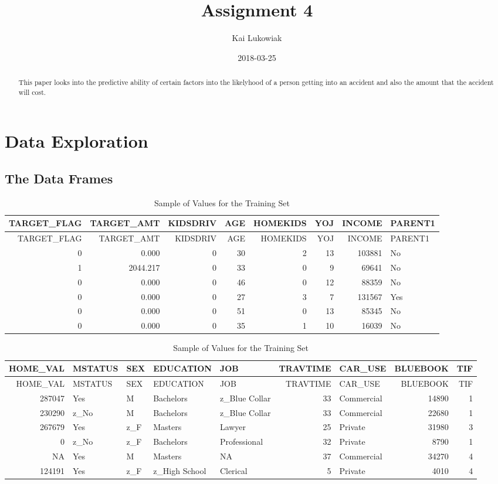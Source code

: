 \documentclass[]{article}
\title{Assignment 4}
\author{Kai Lukowiak}
\date{2018-03-25}
\begin{document}
\maketitle
\begin{abstract}
This paper looks into the predictive ability of certain factors into the
likelyhood of a person getting into an accident and also the amount that
the accident will cost.
\end{abstract}

{
\setcounter{tocdepth}{3}
\tableofcontents
}
\hypertarget{data-exploration}{%
\section{Data Exploration}\label{data-exploration}}

\hypertarget{the-data-frames}{%
\subsection{The Data Frames}\label{the-data-frames}}

\begin{longtable}[]{@{}rrrrrrrl@{}}
\caption{Sample of Values for the Training Set}\tabularnewline
\toprule
TARGET\_FLAG & TARGET\_AMT & KIDSDRIV & AGE & HOMEKIDS & YOJ & INCOME &
PARENT1\tabularnewline
\midrule
\endfirsthead
\toprule
TARGET\_FLAG & TARGET\_AMT & KIDSDRIV & AGE & HOMEKIDS & YOJ & INCOME &
PARENT1\tabularnewline
\midrule
\endhead
0 & 0.000 & 0 & 30 & 2 & 13 & 103881 & No\tabularnewline
1 & 2044.217 & 0 & 33 & 0 & 9 & 69641 & No\tabularnewline
0 & 0.000 & 0 & 46 & 0 & 12 & 88359 & No\tabularnewline
0 & 0.000 & 0 & 27 & 3 & 7 & 131567 & Yes\tabularnewline
0 & 0.000 & 0 & 51 & 0 & 13 & 85345 & No\tabularnewline
0 & 0.000 & 0 & 35 & 1 & 10 & 16039 & No\tabularnewline
\bottomrule
\end{longtable}

\begin{longtable}[]{@{}rllllrlrr@{}}
\caption{Sample of Values for the Training Set}\tabularnewline
\toprule
HOME\_VAL & MSTATUS & SEX & EDUCATION & JOB & TRAVTIME & CAR\_USE &
BLUEBOOK & TIF\tabularnewline
\midrule
\endfirsthead
\toprule
HOME\_VAL & MSTATUS & SEX & EDUCATION & JOB & TRAVTIME & CAR\_USE &
BLUEBOOK & TIF\tabularnewline
\midrule
\endhead
287047 & Yes & M & Bachelors & z\_Blue Collar & 33 & Commercial & 14890
& 1\tabularnewline
230290 & z\_No & M & Bachelors & z\_Blue Collar & 33 & Commercial &
22680 & 1\tabularnewline
267679 & Yes & z\_F & Masters & Lawyer & 25 & Private & 31980 &
3\tabularnewline
0 & z\_No & z\_F & Bachelors & Professional & 32 & Private & 8790 &
1\tabularnewline
NA & Yes & M & Masters & NA & 37 & Commercial & 34270 & 4\tabularnewline
124191 & Yes & z\_F & z\_High School & Clerical & 5 & Private & 4010 &
4\tabularnewline
\bottomrule
\end{longtable}
\end{document}
